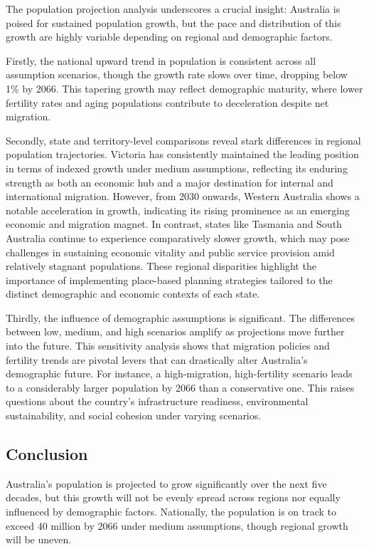 \documentclass[
  11pt,
]{article}
\begin{document}
The population projection analysis underscores a crucial insight:
Australia is poised for sustained population growth, but the pace and
distribution of this growth are highly variable depending on regional
and demographic factors.

Firstly, the national upward trend in population is consistent across
all assumption scenarios, though the growth rate slows over time,
dropping below 1\% by 2066. This tapering growth may reflect demographic
maturity, where lower fertility rates and aging populations contribute
to deceleration despite net migration.

Secondly, state and territory-level comparisons reveal stark differences
in regional population trajectories. Victoria has consistently
maintained the leading position in terms of indexed growth under medium
assumptions, reflecting its enduring strength as both an economic hub
and a major destination for internal and international migration.
However, from 2030 onwards, Western Australia shows a notable
acceleration in growth, indicating its rising prominence as an emerging
economic and migration magnet. In contrast, states like Tasmania and
South Australia continue to experience comparatively slower growth,
which may pose challenges in sustaining economic vitality and public
service provision amid relatively stagnant populations. These regional
disparities highlight the importance of implementing place-based
planning strategies tailored to the distinct demographic and economic
contexts of each state.

Thirdly, the influence of demographic assumptions is significant. The
differences between low, medium, and high scenarios amplify as
projections move further into the future. This sensitivity analysis
shows that migration policies and fertility trends are pivotal levers
that can drastically alter Australia's demographic future. For instance,
a high-migration, high-fertility scenario leads to a considerably larger
population by 2066 than a conservative one. This raises questions about
the country's infrastructure readiness, environmental sustainability,
and social cohesion under varying scenarios.

\subsection{Conclusion}\label{conclusion}

Australia's population is projected to grow significantly over the next
five decades, but this growth will not be evenly spread across regions
nor equally influenced by demographic factors. Nationally, the
population is on track to exceed 40 million by 2066 under medium
assumptions, though regional growth will be uneven.
\end{document}
